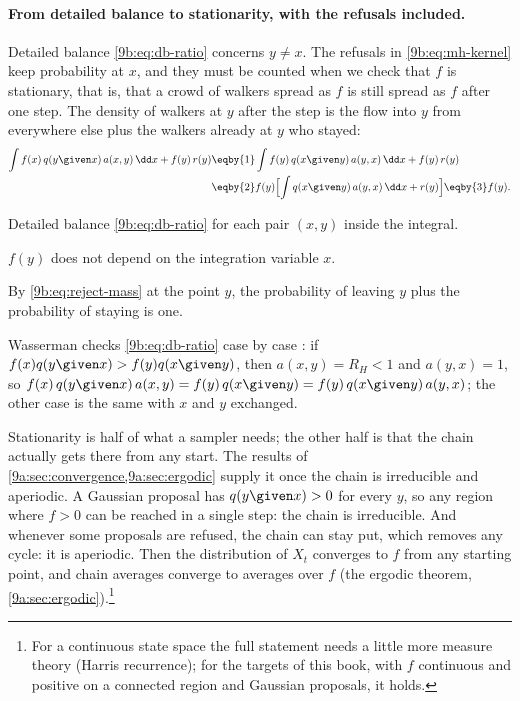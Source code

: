 \paragraph{From detailed balance to stationarity, with the refusals included.}
Detailed balance \eqref{9b:eq:db-ratio} concerns $y\ne x$. The refusals in
\eqref{9b:eq:mh-kernel} keep probability at $x$, and they must be counted when we check that $f$
is stationary, that is, that a crowd of walkers spread as $f$ is still spread as $f$ after one
step. The density of walkers at $y$ after the step is the flow into $y$ from everywhere else plus
the walkers already at $y$ who stayed:
\begin{align}
  \int f(x)\,q(y\given x)\,a(x,y)\,\dd x+f(y)\,r(y)
  &\eqby{1}\int f(y)\,q(x\given y)\,a(y,x)\,\dd x+f(y)\,r(y)
  \nonumber\\
  &\eqby{2}f(y)\Bigl[\int q(x\given y)\,a(y,x)\,\dd x+r(y)\Bigr]
   \eqby{3}f(y).
  \label{9b:eq:mh-stationary}
\end{align}
\begin{explain}
  \item Detailed balance \eqref{9b:eq:db-ratio} for each pair $(x,y)$ inside the integral.
  \item $f(y)$ does not depend on the integration variable $x$.
  \item By \eqref{9b:eq:reject-mass} at the point $y$, the probability of leaving $y$ plus the
        probability of staying is one.
\end{explain}
Wasserman checks \eqref{9b:eq:db-ratio} case by case : if
$f(x)q(y\given x)>f(y)q(x\given y)$, then $a(x,y)=R_H<1$ and $a(y,x)=1$, so
$f(x)\,q(y\given x)\,a(x,y)=f(y)\,q(x\given y)=f(y)\,q(x\given y)\,a(y,x)$; the other case is the
same with $x$ and $y$ exchanged.

Stationarity is half of what a sampler needs; the other half is that the chain actually gets
there from any start. The results of \cref{9a:sec:convergence,9a:sec:ergodic} supply it once the
chain is irreducible and aperiodic. A Gaussian proposal has $q(y\given x)>0$ for every $y$, so
any region where $f>0$ can be reached in a single step: the chain is irreducible. And whenever
some proposals are refused, the chain can stay put, which removes any cycle: it is aperiodic.
Then the distribution of $X_t$ converges to $f$ from any starting point, and chain averages
converge to averages over $f$ (the ergodic theorem, \cref{9a:sec:ergodic}).\footnote{For a
continuous state space the full statement needs a little more measure theory (Harris
recurrence); for the targets of this book, with $f$ continuous and positive on a connected
region and Gaussian proposals, it holds.}

